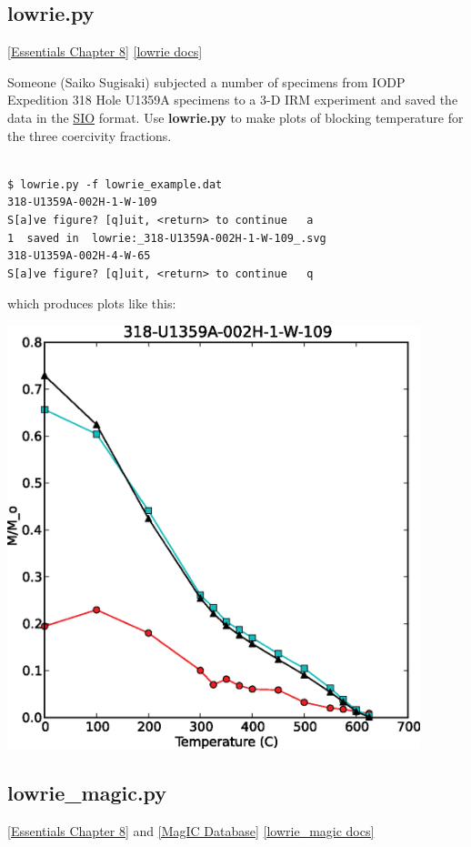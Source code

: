 \documentclass[11pt]{book}
\begin{document}
{{
\subsection{lowrie.py}
\href{http://earthref.org/MAGIC/books/Tauxe/Essentials/WebBook3ch8.html#lowrie}{[Essentials Chapter 8]}
\href{https://github.com/PmagPy/PmagPy/blob/master/programs/lowrie.py}{[lowrie docs]}

Someone (Saiko Sugisaki) subjected a number of specimens from IODP Expedition 318 Hole U1359A specimens to a 3-D IRM experiment and saved the data in the \href{#sio_magic.py}{SIO} format.
Use {\bf lowrie.py} to make plots of blocking temperature for the three  coercivity fractions.

\begin{verbatim}

$ lowrie.py -f lowrie_example.dat
318-U1359A-002H-1-W-109
S[a]ve figure? [q]uit, <return> to continue   a
1  saved in  lowrie:_318-U1359A-002H-1-W-109_.svg
318-U1359A-002H-4-W-65
S[a]ve figure? [q]uit, <return> to continue   q
\end{verbatim}

which produces plots like this:

\includegraphics[width=12cm]{EPSfiles/lowrie.eps}

\subsection{lowrie\_magic.py}
\href{http://earthref.org/MAGIC/books/Tauxe/Essentials/WebBook3ch8.html#lowrie}{[Essentials Chapter 8]} and \href{#MagICDatabase}{[MagIC Database]}
\href{https://github.com/PmagPy/PmagPy/blob/master/programs/lowrie_magic.py}{[lowrie\_magic docs]}

}}
\end{document}
